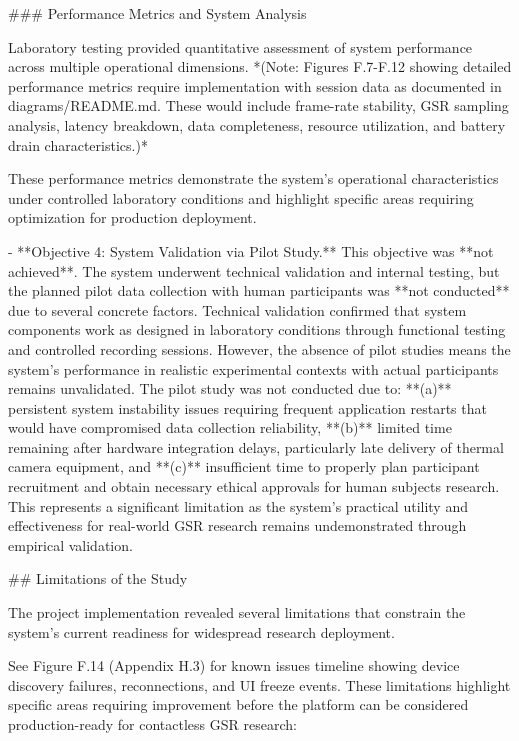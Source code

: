 \documentclass[12pt,a4paper]{article}
\begin{document}
{### Performance Metrics and System Analysis

Laboratory testing provided quantitative assessment of system performance across multiple operational dimensions. *(Note: Figures F.7-F.12 showing detailed performance metrics require implementation with session data as documented in diagrams/README.md. These would include frame-rate stability, GSR sampling analysis, latency breakdown, data completeness, resource utilization, and battery drain characteristics.)*

These performance metrics demonstrate the system's operational characteristics under controlled laboratory conditions and highlight specific areas requiring optimization for production deployment.

- **Objective 4: System Validation via Pilot Study.** This objective was
  **not achieved**. The system underwent technical validation and internal
  testing, but the planned pilot data collection with human participants
  was **not conducted** due to several concrete factors. Technical validation
  confirmed that system components work as designed in laboratory conditions
  through functional testing and controlled recording sessions. However, the
  absence of pilot studies means the system's performance in realistic
  experimental contexts with actual participants remains unvalidated.
  The pilot study was not conducted due to: **(a)** persistent system
  instability issues requiring frequent application restarts that would
  have compromised data collection reliability, **(b)** limited time
  remaining after hardware integration delays, particularly late delivery
  of thermal camera equipment, and **(c)** insufficient time to properly
  plan participant recruitment and obtain necessary ethical approvals for
  human subjects research. This represents a significant limitation as
  the system's practical utility and effectiveness for real-world GSR
  research remains undemonstrated through empirical validation.

## Limitations of the Study

The project implementation revealed several limitations that constrain the system's current readiness for widespread research deployment. 

See Figure F.14 (Appendix H.3) for known issues timeline showing device discovery failures, reconnections, and UI freeze events. These limitations highlight specific areas requiring improvement before the platform can be considered production-ready for contactless GSR research:

}
\end{document}
